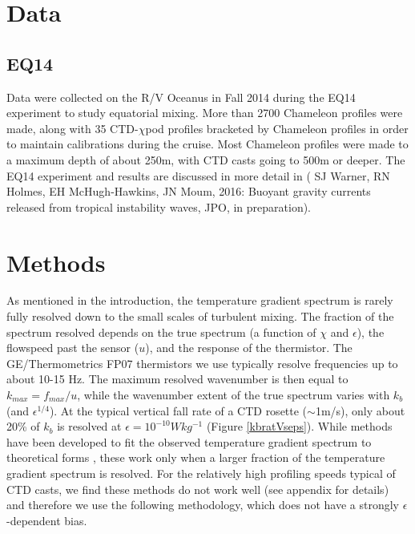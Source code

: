 \documentclass{ametsoc}
\begin{document}
\section{Data }


\subsection{EQ14}

Data were collected on the R/V Oceanus in Fall 2014 during the EQ14 experiment to study equatorial mixing.  More than 2700 Chameleon profiles were made, along with 35 CTD-$\chi$pod profiles bracketed by Chameleon profiles in order to maintain calibrations during the cruise. Most Chameleon profiles were made to a maximum depth of about 250m, with CTD casts going to 500m or deeper. The EQ14 experiment and results are discussed in more detail in ( SJ Warner, RN Holmes, EH McHugh-Hawkins, JN Moum, 2016: Buoyant gravity currents released from tropical instability waves, JPO, in preparation).




\section{Methods}


As mentioned in the introduction, the temperature gradient spectrum is rarely fully resolved down to the small scales of turbulent mixing. The fraction of the spectrum resolved depends on the true spectrum (a function of $\chi$ and $\epsilon$), the flowspeed past the sensor ($u$), and the response of the thermistor. The GE/Thermometrics FP07 thermistors we use typically resolve frequencies up to about 10-15 Hz. The maximum resolved wavenumber is then equal to $k_{max}=f_{max}/u$, while the wavenumber extent of the true spectrum varies with $k_b$ (and $\epsilon^{1/4}$). At the typical vertical fall rate of a CTD rosette ($\sim$1m/s), only about 20\% of $k_b$ is resolved at $\epsilon=10^{-10}Wkg^{-1}$ (Figure \ref{kbratVseps}). While methods have been developed to fit the observed temperature gradient spectrum to theoretical forms \citep{ruddicketal00}, these work only when a larger fraction of the temperature gradient spectrum is resolved. For the relatively high profiling speeds typical of CTD casts, we find these methods do not work well (see appendix for details) and therefore we use the following methodology, which does not have a strongly $\epsilon$-dependent bias.
\end{document}

